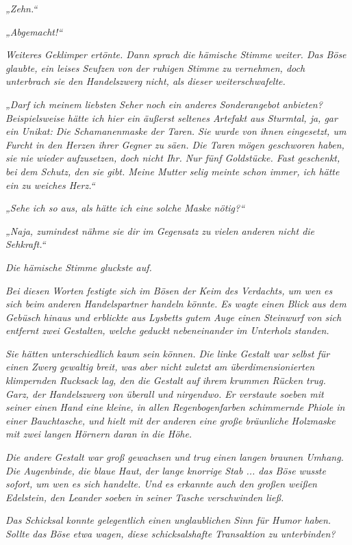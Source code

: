 \textit{„Zehn.“}

\textit{„Abgemacht!“}

\textit{Weiteres Geklimper ertönte. Dann sprach die hämische Stimme weiter. Das Böse glaubte, ein leises Seufzen von der ruhigen Stimme zu vernehmen, doch unterbrach sie den Handelszwerg nicht, als dieser weiterschwafelte.}

\textit{„Darf ich meinem liebsten Seher noch ein anderes Sonderangebot anbieten? Beispielsweise hätte ich hier ein äußerst seltenes Artefakt aus Sturmtal, ja, gar ein Unikat: Die Schamanenmaske der Taren. Sie wurde von ihnen eingesetzt, um Furcht in den Herzen ihrer Gegner zu säen. Die Taren mögen geschworen haben, sie nie wieder aufzusetzen, doch nicht Ihr. Nur fünf Goldstücke. Fast geschenkt, bei dem Schutz, den sie gibt. Meine Mutter selig meinte schon immer, ich hätte ein zu weiches Herz.“}

\textit{„Sehe ich so aus, als hätte ich eine solche Maske nötig?“}

\textit{„Naja, zumindest nähme sie dir im Gegensatz zu vielen anderen nicht die Sehkraft.“}

\textit{Die hämische Stimme gluckste auf.}

\textit{Bei diesen Worten festigte sich im Bösen der Keim des Verdachts, um wen es sich beim anderen Handelspartner handeln könnte. Es wagte einen Blick aus dem Gebüsch hinaus und erblickte aus Lysbetts gutem Auge einen Steinwurf von sich entfernt zwei Gestalten, welche geduckt nebeneinander im Unterholz standen.}

\textit{Sie hätten unterschiedlich kaum sein können. Die linke Gestalt war selbst für einen Zwerg gewaltig breit, was aber nicht zuletzt am überdimensionierten klimpernden Rucksack lag, den die Gestalt auf ihrem krummen Rücken trug. Garz, der Handelszwerg von überall und nirgendwo. Er verstaute soeben mit seiner einen Hand eine kleine, in allen Regenbogenfarben schimmernde Phiole in einer Bauchtasche, und hielt mit der anderen eine große bräunliche Holzmaske mit zwei langen Hörnern daran in die Höhe.}

\textit{Die andere Gestalt war groß gewachsen und trug einen langen braunen Umhang. Die Augenbinde, die blaue Haut, der lange knorrige Stab ... das Böse wusste sofort, um wen es sich handelte. Und es erkannte auch den großen weißen Edelstein, den Leander soeben in seiner Tasche verschwinden ließ.}

\textit{Das Schicksal konnte gelegentlich einen unglaublichen Sinn für Humor haben. Sollte das Böse etwa wagen, diese schicksalshafte Transaktion zu unterbinden?}

